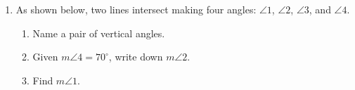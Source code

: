 \begin{enumerate}
  \item As shown below, two lines intersect making four angles: $\angle 1$, $\angle 2$, $\angle 3$, and $\angle 4$.
  \begin{multicols}{2}  
    \begin{enumerate}
      \item Name a pair of vertical angles. \vspace{1.5cm}
      \item Given $m\angle 4 = 70^\circ$, write down $m\angle 2$. \vspace{1.5cm}
      \item Find $m\angle 1$. \vspace{2cm}
    \end{enumerate}
  \end{multicols}
  

\end{enumerate}
